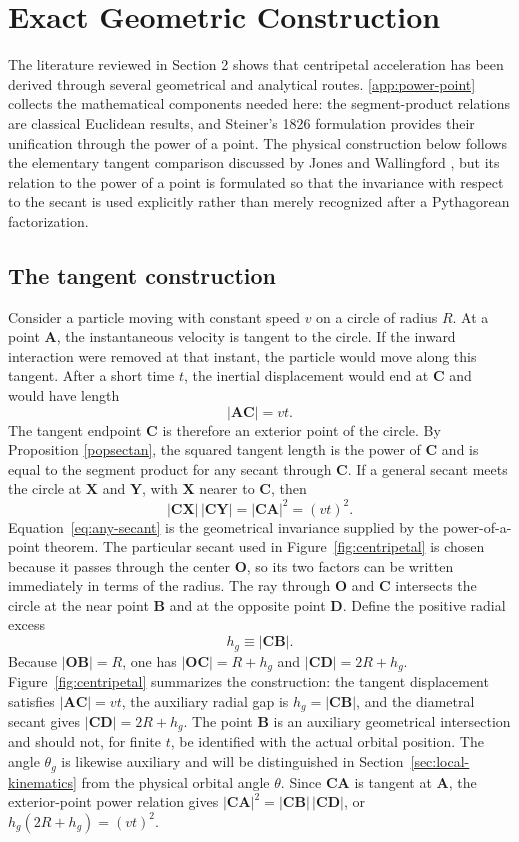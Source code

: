 \documentclass[preprint,12pt,3p,nopreprintline]{elsarticle}
\newcommand{\pt}[1]{\mathbf{#1}}
\newcommand{\seg}[1]{\mathbf{#1}}
\newcommand{\seglen}[1]{\lvert\mathbf{#1}\rvert}
\newcommand{\be}{\begin{equation}}
\newcommand{\ee}{\end{equation}}
\numberwithin{equation}{section}
\theoremstyle{remark}
\begin{document}
\section{Exact Geometric Construction}\label{sec:exact-geometry}

The literature reviewed in Section 2 shows that centripetal acceleration has been derived through several geometrical and analytical routes. \ref{app:power-point} collects the mathematical components needed here: the segment-product relations are classical Euclidean results, and Steiner's 1826 formulation \cite{steiner1826einige} provides their unification through the power of a point. The physical construction below follows the elementary tangent comparison discussed by Jones and Wallingford \cite{jones1969simple}, but its relation to the power of a point is formulated so that the invariance with respect to the secant is used explicitly rather than merely recognized after a Pythagorean factorization.

\subsection{The tangent construction}

Consider a particle moving with constant speed $v$ on a circle of radius $R$. At a point $\pt{A}$, the instantaneous velocity is tangent to the circle. If the inward interaction were removed at that instant, the particle would move along this tangent. After a short time $t$, the inertial displacement would end at $\pt{C}$ and would have length
\be
\seglen{AC}=vt.
\label{eq:tangent-length}
\ee
The tangent endpoint $\pt{C}$ is therefore an exterior point of the circle. By Proposition \ref{popsectan}, the squared tangent length is the power of $\pt{C}$ and is equal to the segment product for any secant through $\pt{C}$. If a general secant meets the circle at $\pt{X}$ and $\pt{Y}$, with $\pt{X}$ nearer to $\pt{C}$, then
\be
\seglen{CX}\,\seglen{CY}=\seglen{CA}^{2}=(vt)^2.
\label{eq:any-secant}
\ee
Equation~\eqref{eq:any-secant} is the geometrical invariance supplied by the power-of-a-point theorem. The particular secant used in Figure~\ref{fig:centripetal} is chosen because it passes through the center $\pt{O}$, so its two factors can be written immediately in terms of the radius. The ray through $\pt{O}$ and $\pt{C}$ intersects the circle at the near point $\pt{B}$ and at the opposite point $\pt{D}$. Define the positive radial excess
\be
h_g\equiv\seglen{CB}.
\label{eq:hg-definition}
\ee
Because $\seglen{OB}=R$, one has $\seglen{OC}=R+h_g$ and $\seglen{CD}=2R+h_g$. Figure~\ref{fig:centripetal} summarizes the construction: the tangent displacement satisfies $\seglen{AC}=vt$, the auxiliary radial gap is $h_g=\seglen{CB}$, and the diametral secant gives $\seglen{CD}=2R+h_g$. The point $\pt{B}$ is an auxiliary geometrical intersection and should not, for finite $t$, be identified with the actual orbital position. The angle $\theta_g$ is likewise auxiliary and will be distinguished in Section~\ref{sec:local-kinematics} from the physical orbital angle $\theta$. Since $\seg{CA}$ is tangent at $\pt{A}$, the exterior-point power relation gives $\seglen{CA}^{2}=\seglen{CB}\,\seglen{CD}$, or $h_g(2R+h_g)=(vt)^2$.
\end{document}
